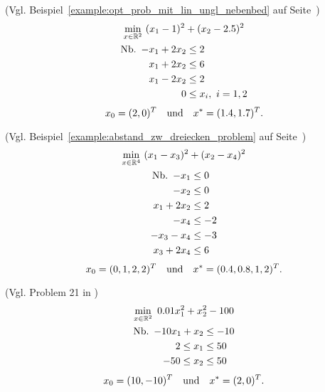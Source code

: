 \begin{testproblem}
(Vgl. Beispiel~\ref{example:opt_prob_mit_lin_ungl_nebenbed} auf Seite~\pageref{example:opt_prob_mit_lin_ungl_nebenbed})
\begin{gather}
\min_{x\in\R^2}\ (x_1 - 1)^2 + (x_2 - 2.5)^2 \notag \\
\begin{split}
\nb -x_1 + 2 x_2 & \leq 2 \\
x_1 + 2 x_2 & \leq 6 \\
x_1 - 2 x_2 & \leq 2 \\
0 & \leq x_i,\ i = 1,2 \\
\end{split}
\end{gather}
\begin{equation*}
x_0 = (2, 0)^T \quad\text{und}\quad x^* = (1.4, 1.7)^T.
\end{equation*}
\end{testproblem}

\begin{testproblem}
(Vgl. Beispiel~\ref{example:abstand_zw_dreiecken_problem} auf Seite~\pageref{example:abstand_zw_dreiecken_problem})
\begin{gather}
\min_{x\in\R^4}\ (x_1 - x_3)^2 + (x_2 - x_4)^2 \notag \\
\begin{split}
\nb -x_1 & \leq 0 \\
-x_2 & \leq 0 \\
x_1 + 2 x_2 & \leq 2 \\
-x_4 & \leq -2 \\
-x_3 - x_4 & \leq -3 \\
x_3 + 2 x_4 & \leq 6 \\
\end{split}
\end{gather}
\begin{equation*}
x_0 = (0, 1, 2, 2)^T \quad\text{und}\quad x^* = (0.4, 0.8, 1, 2)^T.
\end{equation*}
\end{testproblem}

\begin{testproblem}
(Vgl. Problem 21 in \cite[S.~44]{hock})
\begin{gather}
\min_{x\in\R^2}\ 0.01 x_1^2 + x_2^2 - 100 \notag \\
\begin{split}
\nb -10 x_1 + x_2 & \leq -10 \\
2 \leq x_1 & \leq 50 \\
-50 \leq x_2 & \leq 50 \\
\end{split}
\end{gather}
\begin{equation*}
x_0 = (10, -10)^T \quad\text{und}\quad x^* = (2, 0)^T.
\end{equation*}
\end{testproblem}

